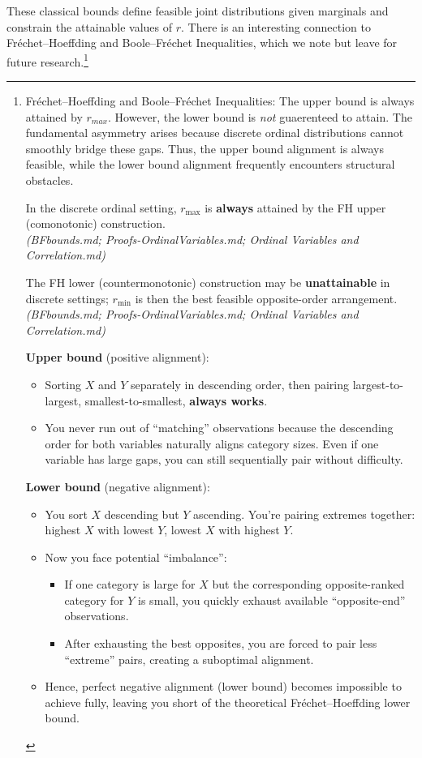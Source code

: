\documentclass[
  12pt,
]{article}
\theoremstyle{plain}
\theoremstyle{definition}
\theoremstyle{remark}
\begin{document}
These classical bounds define feasible joint distributions given
marginals and constrain the attainable values of \(r\). There is an
interesting connection to Fréchet--Hoeffding and Boole--Fréchet
Inequalities, which we note but leave for future research.\footnote{Fréchet--Hoeffding
  and Boole--Fréchet Inequalities: The upper bound is always attained by
  \(r_{max}\). However, the lower bound is \emph{not} guaerenteed to
  attain. The fundamental asymmetry arises because discrete ordinal
  distributions cannot smoothly bridge these gaps. Thus, the upper bound
  alignment is always feasible, while the lower bound alignment
  frequently encounters structural obstacles.

  In the discrete ordinal setting, \(r_{\max}\) is \textbf{always}
  attained by the FH upper (comonotonic) construction.\\
  \emph{(BFbounds.md; Proofs-OrdinalVariables.md; Ordinal Variables and
  Correlation.md)}

  The FH lower (countermonotonic) construction may be
  \textbf{unattainable} in discrete settings; \(r_{\min}\) is then the
  best feasible opposite-order arrangement.\\
  \emph{(BFbounds.md; Proofs-OrdinalVariables.md; Ordinal Variables and
  Correlation.md)}

  \textbf{Upper bound} (positive alignment):

  \begin{itemize}
  \item
    Sorting \(X\) and \(Y\) separately in descending order, then pairing
    largest-to-largest, smallest-to-smallest, \textbf{always works}.
  \item
    You never run out of ``matching'' observations because the
    descending order for both variables naturally aligns category sizes.
    Even if one variable has large gaps, you can still sequentially pair
    without difficulty.
  \end{itemize}

  \textbf{Lower bound} (negative alignment):

  \begin{itemize}
  \item
    You sort \(X\) descending but \(Y\) ascending. You're pairing
    extremes together: highest \(X\) with lowest \(Y\), lowest \(X\)
    with highest \(Y\).
  \item
    Now you face potential ``imbalance'':

    \begin{itemize}
    \item
      If one category is large for \(X\) but the corresponding
      opposite-ranked category for \(Y\) is small, you quickly exhaust
      available ``opposite-end'' observations.
    \item
      After exhausting the best opposites, you are forced to pair less
      ``extreme'' pairs, creating a suboptimal alignment.
    \end{itemize}
  \item
    Hence, perfect negative alignment (lower bound) becomes impossible
    to achieve fully, leaving you short of the theoretical
    Fréchet--Hoeffding lower bound.
  \end{itemize}}
\end{document}
